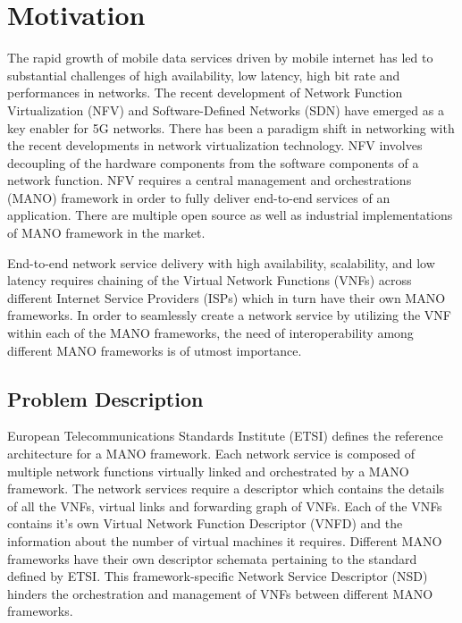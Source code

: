 \chapter{Motivation}
\label{ch:Motivation}
The rapid growth of mobile data services driven by mobile internet has led to substantial challenges of high availability, low latency, high bit rate and performances in networks. The recent development of Network Function Virtualization (NFV) and Software-Defined Networks (SDN) have emerged as a key enabler for 5G networks. 
There has been a paradigm shift in networking with the recent developments in network virtualization technology. NFV involves decoupling of the hardware components from the software components of a network function. NFV requires a central management and orchestrations (MANO) framework in order to fully deliver end-to-end services of an application. There are multiple open source as well as industrial implementations of MANO framework in the market. 

End-to-end network service delivery with high availability, scalability, and low latency requires chaining of the Virtual Network Functions (VNFs) across different Internet Service Providers (ISPs) which in turn have their own MANO frameworks. In order to seamlessly create a network service by utilizing the VNF within each of the MANO frameworks, the need of interoperability among different MANO frameworks is of utmost importance.


\section{Problem Description}

European Telecommunications Standards Institute (ETSI) defines the reference architecture for a MANO framework. Each network service is composed of multiple network functions virtually linked and orchestrated by a MANO framework. The network services require a descriptor which contains the details of all the VNFs, virtual links and forwarding graph of VNFs. Each of the VNFs contains it's own Virtual Network Function Descriptor (VNFD) and the information about the number of virtual machines it requires. Different MANO frameworks have their own descriptor schemata pertaining to the standard defined by ETSI. This framework-specific Network Service Descriptor (NSD) hinders the orchestration and management of VNFs between different MANO frameworks. 

